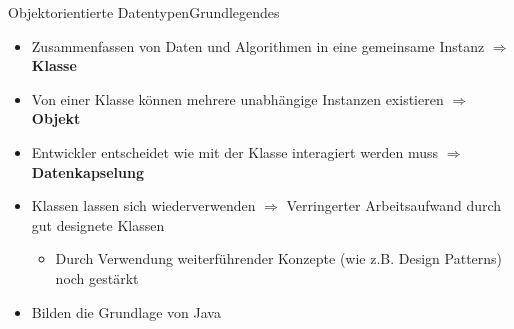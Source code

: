 \begin{frame}{Objektorientierte Datentypen}{Grundlegendes}
	\begin{itemize}<+->
		\item Zusammenfassen von Daten und Algorithmen in eine gemeinsame Instanz $\Rightarrow$ \textbf{Klasse}
		\item Von einer Klasse können mehrere unabhängige Instanzen existieren $\Rightarrow$ \textbf{Objekt}
		\item Entwickler entscheidet wie mit der Klasse interagiert werden muss $\Rightarrow$ \textbf{Datenkapselung}
		\item Klassen lassen sich wiederverwenden $\Rightarrow$ Verringerter Arbeitsaufwand durch gut designete Klassen
		\begin{itemize}
			\item Durch Verwendung weiterführender Konzepte (wie z.B. Design Patterns) noch gestärkt
		\end{itemize}
		\item Bilden die Grundlage von Java
	\end{itemize}
\end{frame}

\begin{frame}Objektorientierte Datentypen}{Vererbung}
\end{frame}
